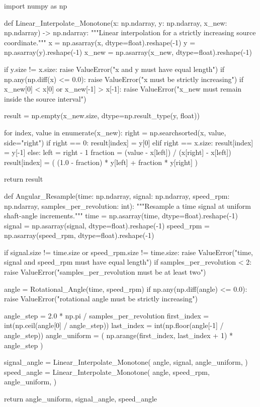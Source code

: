 \begin{python}
import numpy as np


def Linear_Interpolate_Monotone(x: np.ndarray,
                                y: np.ndarray,
                                x_new: np.ndarray) -> np.ndarray:
    """Linear interpolation for a strictly increasing source coordinate."""
    x = np.asarray(x, dtype=float).reshape(-1)
    y = np.asarray(y).reshape(-1)
    x_new = np.asarray(x_new, dtype=float).reshape(-1)

    if y.size != x.size:
        raise ValueError("x and y must have equal length")
    if np.any(np.diff(x) <= 0.0):
        raise ValueError("x must be strictly increasing")
    if x_new[0] < x[0] or x_new[-1] > x[-1]:
        raise ValueError("x_new must remain inside the source interval")

    result = np.empty(x_new.size, dtype=np.result_type(y, float))

    for index, value in enumerate(x_new):
        right = np.searchsorted(x, value, side="right")
        if right == 0:
            result[index] = y[0]
        elif right == x.size:
            result[index] = y[-1]
        else:
            left = right - 1
            fraction = (value - x[left]) / (x[right] - x[left])
            result[index] = (
                (1.0 - fraction) * y[left]
                + fraction * y[right]
            )

    return result


def Angular_Resample(time: np.ndarray,
                     signal: np.ndarray,
                     speed_rpm: np.ndarray,
                     samples_per_revolution: int):
    """Resample a time signal at uniform shaft-angle increments."""
    time = np.asarray(time, dtype=float).reshape(-1)
    signal = np.asarray(signal, dtype=float).reshape(-1)
    speed_rpm = np.asarray(speed_rpm, dtype=float).reshape(-1)

    if signal.size != time.size or speed_rpm.size != time.size:
        raise ValueError("time, signal and speed_rpm must have equal length")
    if samples_per_revolution < 2:
        raise ValueError("samples_per_revolution must be at least two")

    angle = Rotational_Angle(time, speed_rpm)
    if np.any(np.diff(angle) <= 0.0):
        raise ValueError("rotational angle must be strictly increasing")

    angle_step = 2.0 * np.pi / samples_per_revolution
    first_index = int(np.ceil(angle[0] / angle_step))
    last_index = int(np.floor(angle[-1] / angle_step))
    angle_uniform = (
        np.arange(first_index, last_index + 1) * angle_step
    )

    signal_angle = Linear_Interpolate_Monotone(
        angle,
        signal,
        angle_uniform,
    )
    speed_angle = Linear_Interpolate_Monotone(
        angle,
        speed_rpm,
        angle_uniform,
    )

    return angle_uniform, signal_angle, speed_angle
\end{python}

